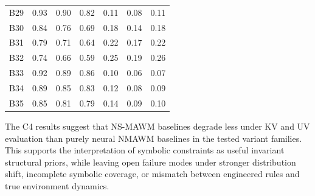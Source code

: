 \documentclass{article}
\theoremstyle{plain}
\theoremstyle{definition}
\theoremstyle{remark}
\begin{document}
\begin{table}[h!]
{\begin{tabular}{lcccccc}
      B29                      &
      0.93                     &
      0.90                     &
      0.82                     &
      0.11                     &
      0.08                     &
      0.11                            \\

      B30                      &
      0.84                     &
      0.76                     &
      0.69                     &
      0.18                     &
      0.14                     &
      0.18                            \\

      B31                      &
      0.79                     &
      0.71                     &
      0.64                     &
      0.22                     &
      0.17                     &
      0.22                            \\

      B32                      &
      0.74                     &
      0.66                     &
      0.59                     &
      0.25                     &
      0.19                     &
      0.26                            \\

      B33                      &
      0.92                     &
      0.89                     &
      0.86                     &
      0.10                     &
      0.06                     &
      0.07                            \\

      B34                      &
      0.89                     &
      0.85                     &
      0.83                     &
      0.12                     &
      0.08                     &
      0.09                            \\

      B35                      &
      0.85                     &
      0.81                     &
      0.79                     &
      0.14                     &
      0.09                     &
      0.10                            \\

      \bottomrule
    \end{tabular}
  }
\end{table}

The C4 results suggest that NS-MAWM baselines degrade less under KV and UV evaluation than purely neural NMAWM baselines in the tested variant families. This supports the interpretation of symbolic constraints as useful invariant structural priors, while leaving open failure modes under stronger distribution shift, incomplete symbolic coverage, or mismatch between engineered rules and true environment dynamics.
\end{document}
